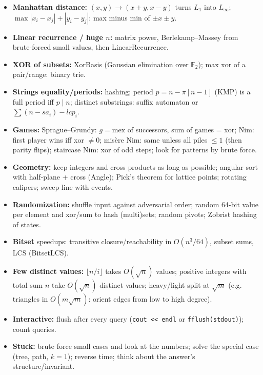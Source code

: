 \begin{itemize}
		(see Graph/Math), 2-SAT for binary choices with pairwise constraints.
	\item \textbf{Manhattan distance:} $(x, y) \to (x+y, x-y)$ turns $L_1$ into $L_\infty$;
		$\max |x_i-x_j|+|y_i-y_j|$: max minus min of $\pm x \pm y$.
	\item \textbf{Linear recurrence / huge $n$:} matrix power, Berlekamp--Massey from brute-forced
		small values, then LinearRecurrence.
	\item \textbf{XOR of subsets:} XorBasis (Gaussian elimination over $\mathbb F_2$);
		max xor of a pair/range: binary trie.
	\item \textbf{Strings equality/periods:} hashing; period $p = n - \pi[n-1]$ (KMP) is a full period iff $p \mid n$;
		distinct substrings: suffix automaton or $\sum (n - sa_i) - lcp_i$.
	\item \textbf{Games:} Sprague--Grundy: $g = \text{mex}$ of successors, sum of games = xor;
		Nim: first player wins iff xor $\ne 0$; misère Nim: same unless all piles $\le 1$ (then parity flips);
		staircase Nim: xor of odd steps; look for patterns by brute force.
	\item \textbf{Geometry:} keep integers and cross products as long as possible; angular sort with
		half-plane + cross (Angle); Pick's theorem for lattice points; rotating calipers; sweep line with events.
	\item \textbf{Randomization:} shuffle input against adversarial order; random 64-bit value per element and
		xor/sum to hash (multi)sets; random pivots; Zobrist hashing of states.
	\item \textbf{Bitset} speedups: transitive closure/reachability in $O(n^3/64)$, subset sums, LCS (BitsetLCS).
	\item \textbf{Few distinct values:} $\lfloor n/i \rfloor$ takes $O(\sqrt n)$ values;
		positive integers with total sum $n$ take $O(\sqrt n)$ distinct values; heavy/light split at $\sqrt m$
		(e.g. triangles in $O(m\sqrt m)$: orient edges from low to high degree).
	\item \textbf{Interactive:} flush after every query (\texttt{cout <{}< endl} or \texttt{fflush(stdout)}); count queries.
	\item \textbf{Stuck:} brute force small cases and look at the numbers; solve the special case
		(tree, path, $k = 1$); reverse time; think about the answer's structure/invariant.
\end{itemize}

